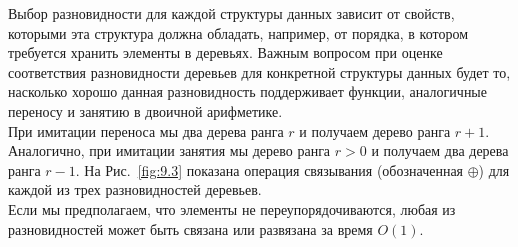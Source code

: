 
\begin{frame}[fragile]{}
 Выбор разновидности для каждой структуры данных
зависит от свойств, которыми эта структура должна обладать, например,
от порядка, в котором требуется хранить элементы в деревьях. Важным
вопросом при оценке соответствия разновидности деревьев для конкретной
структуры данных будет то, насколько хорошо данная разновидность
поддерживает функции, аналогичные переносу и занятию в двоичной
арифметике.\\

 При имитации переноса мы  два дерева
ранга $r$ и получаем дерево ранга $r+1$. Аналогично, при имитации
занятия мы  дерево ранга $r > 0$ и получаем
два дерева ранга $r-1$. На Рис.~\ref{fig:9.3} показана операция
связывания (обозначенная $\oplus$)
для каждой из трех разновидностей деревьев.\\

Если мы предполагаем, что
элементы не переупорядочиваются, любая из разновидностей может быть
связана или развязана за время $O(1)$.

\end{frame}

